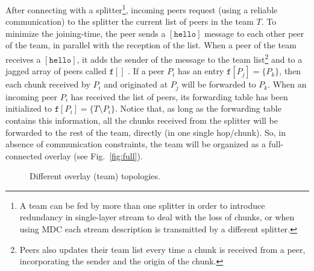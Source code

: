 

\label{sec:joining}

After connecting with a splitter\footnote{A team can be fed by more
  than one splitter in order to introduce redundancy in single-layer
  stream to deal with the loss of chunks, or when using MDC each
  stream description is transmitted by a different splitter.},
incoming peers request (using a reliable communication) to the
splitter the current list of peers in the team $T$. To minimize the
\gls{joining-time}, the peer sends a $[\mathtt{hello}]$ message to
each other peer of the team, in parallel with the reception of the
list. When a peer of the team receives a $[\mathtt{hello}]$, it adds
the sender of the message to the team list\footnote{Peers also updates
  their team list every time a chunk is received from a peer,
  incorporating the sender and the origin of the chunk.} and to a
jagged array of peers called $\mathtt{f}[]$ . If a peer $P_i$ has an entry
$\mathtt{f}[P_j]=\{P_k\}$, then each chunk received by $P_i$ and
originated at $P_j$ will be forwarded to $P_k$. When an incoming peer
$P_i$ has received the list of peers, its forwarding table has been
initialized to $\mathtt{f}[P_i]=\{T\setminus P_i\}$. Notice that, as
long as the forwarding table contains this information, all the chunks
received from the splitter will be forwarded to the rest of the team,
directly (in one single hop/chunk). So, in absence of communication
constraints, the team will be organized as a full-connected overlay
(see Fig.~\ref{fig:full}).

\begin{figure}
  \centering
  \caption{Different overlay (team) topologies.}
  \label{fig:three_topos}
\end{figure}%
  

